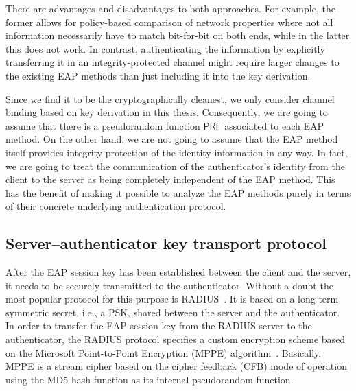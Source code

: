 There are advantages and disadvantages to both approaches.
For example,
the former allows for policy-based comparison of network properties where not all information necessarily have to match bit-for-bit on both ends,
while in the latter this does not work.
In contrast,
authenticating the information by explicitly transferring it in an integrity-protected channel might require larger changes to the existing EAP methods than just including it into the key derivation.

Since we find it to be the cryptographically cleanest,
we only consider channel binding based on key derivation in this thesis.
Consequently,
we are going to assume that there is a pseudorandom function $\mathsf{PRF}$ associated to each EAP method.
On the other hand,
we are not going to assume that the EAP method itself provides integrity protection of the identity information in any way.
In fact,
we are going to treat the communication of the authenticator's identity from the client to the server as being completely independent of the EAP method.
This has the benefit of making it possible to analyze the EAP methods purely in terms of their concrete underlying authentication protocol.




\subsection{Server--authenticator key transport protocol}\label{sec:generic_composition_results:modeling_EAP:AAA}

After the EAP session key has been established between the client and the server,
it needs to be securely transmitted to the authenticator.
Without a doubt the most popular protocol for this purpose is RADIUS~\cite{IETF:RFC2865:RADIUS}.
It is based on a long-term symmetric secret,
i.e., a PSK,
shared between the server and the authenticator.
In order to transfer the EAP session key from the RADIUS server to the authenticator,
the RADIUS protocol specifies a custom encryption scheme based on the Microsoft Point-to-Point Encryption (MPPE) algorithm~\cite{IETF:RFC2548:MS-MPPE-RADIUS-attributes}. 
Basically,
MPPE is a stream cipher based on the cipher feedback (CFB) mode of operation using the MD5 hash function as its internal pseudorandom function.

